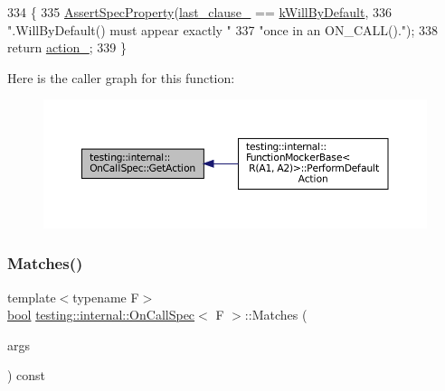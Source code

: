 \begin{DoxyCode}
334                                      \{
335     \hyperlink{classtesting_1_1internal_1_1UntypedOnCallSpecBase_a83d223cf0e48fadc872a7b4062948df4}{AssertSpecProperty}(\hyperlink{classtesting_1_1internal_1_1UntypedOnCallSpecBase_adb6d19adfeb5fde535d854aedbc5fb0f}{last\_clause\_} == 
      \hyperlink{classtesting_1_1internal_1_1UntypedOnCallSpecBase_a78ebf16bfee40375e33a983f3100f354aeb25a21e1aa3dc4ca3a108b5533d7eed}{kWillByDefault},
336                        \textcolor{stringliteral}{".WillByDefault() must appear exactly "}
337                        \textcolor{stringliteral}{"once in an ON\_CALL()."});
338     \textcolor{keywordflow}{return} \hyperlink{classtesting_1_1internal_1_1OnCallSpec_a5868fd7eb5e314e9aef160ebfc9bf834}{action\_};
339   \}
\end{DoxyCode}
Here is the caller graph for this function\+:
\nopagebreak
\begin{figure}[H]
\begin{center}
\leavevmode
\includegraphics[width=350pt]{classtesting_1_1internal_1_1OnCallSpec_a3ef8e41380326823fb5b701f3c52cdb6_icgraph}
\end{center}
\end{figure}
\mbox{\label{classtesting_1_1internal_1_1OnCallSpec_a8113d1ec5775715637a87875dee6cc68}} 
\subsubsection{\texorpdfstring{Matches()}{Matches()}}
{\footnotesize\ttfamily template$<$typename F$>$ \\
\hyperlink{classbool}{bool} \hyperlink{classtesting_1_1internal_1_1OnCallSpec}{testing\+::internal\+::\+On\+Call\+Spec}$<$ F $>$\+::Matches (\begin{DoxyParamCaption}\item[{const \hyperlink{classtesting_1_1internal_1_1OnCallSpec_a70ffab8b915b7b48a90f5ce256da806f}{Argument\+Tuple} \&}]{args }\end{DoxyParamCaption}) const\hspace{0.3cm}{\ttfamily [inline]}}



